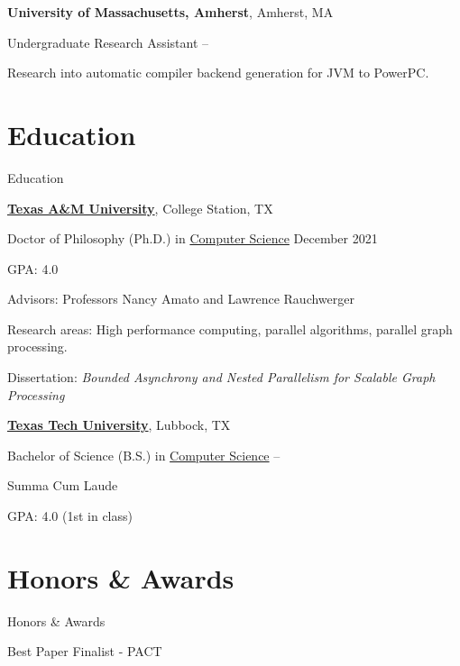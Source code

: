 \documentclass[a4paper,10pt,oneside]{article}
\begin{document}
\begin{body}
\textbf{University of Massachusetts, Amherst}, Amherst, MA
\par
Undergraduate Research Assistant
\hfill
{} --
\begin{detail}
Research into automatic compiler backend generation for JVM to PowerPC.
\end{detail}


\section{Education}
{Education}

\href{http://www.tamu.edu}
{\textbf{Texas A\&M University}},
College Station, TX

\SmallEntryGap
Doctor of Philosophy (Ph.D.) in
\href{http://cse.tamu.edu}
{Computer Science}
\hfill
December 2021
\begin{detail}
\begin{detail}
GPA: 4.0
\end{detail}
Advisors:
Professors Nancy Amato and Lawrence Rauchwerger
\par
Research areas:
High performance computing, parallel algorithms, parallel graph processing.
\par
Dissertation: \emph{Bounded Asynchrony and Nested Parallelism for Scalable Graph Processing}
\end{detail}

\EntryGap
\href{http://www.ttu.edu}
{\textbf{Texas Tech University}},
Lubbock, TX
\par
Bachelor of Science (B.S.) in
\href{http://cs.ttu.edu}
{Computer Science}
\hfill
{} --
\begin{detail}
Summa Cum Laude
\par
GPA: 4.0 (1st in class)
\end{detail}



\section{Honors \& Awards}
{Honors\newline
\& Awards}

Best Paper Finalist - PACT
\hfill
{}


\end{body}
\end{document}
